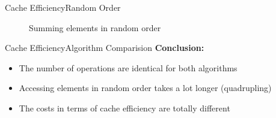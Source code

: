 

%
%  
%
%
%  


\begin{frame}{Cache Efficiency}{Random Order}
  \begin{figure}
    
    \vspace{-1.0em}
    \caption{Summing elements in random order}
    \label{fig:caching:sum_random_order}
  \end{figure}
\end{frame}


\begin{frame}{Cache Efficiency}{Algorithm Comparision}
  \textbf{Conclusion:}
  \begin{itemize}
    \item
      The number of operations are identical for both algorithms
    \item
      Accessing elements in random order takes a lot longer (quadrupling)
    \item
      The costs in terms of cache efficiency are totally different
  \end{itemize}
\end{frame}

